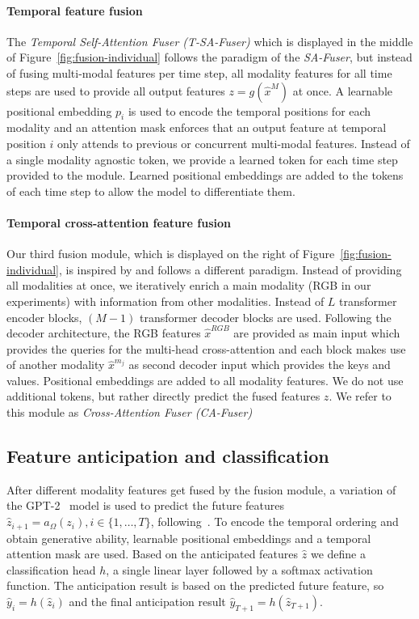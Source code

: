 \documentclass[10pt,twocolumn,letterpaper,dvipsnames]{article}
\begin{document}
\paragraph{Temporal feature fusion}
\label{sec:t-cmtfuser}
The \emph{Temporal Self-Attention Fuser (T-SA-Fuser)} which is displayed in the middle of Figure~\ref{fig:fusion-individual} follows the paradigm of the \emph{SA-Fuser}, but instead of fusing multi-modal features per time step, all modality features for all time steps are used to provide all output features $z = g(\hat{x}^M)$ at once. A learnable positional embedding $p_i$ is used to encode the temporal positions for each modality and an attention mask enforces that an output feature at temporal position $i$ only attends to previous or concurrent multi-modal features. Instead of a single modality agnostic token, we provide a learned token for each time step provided to the module. Learned positional embeddings are added to the tokens of each time step to allow the model to differentiate them.
\paragraph{Temporal cross-attention feature fusion}
Our third fusion module, which is displayed on the right of Figure~\ref{fig:fusion-individual}, is inspired by \cite{huang2020multimodal} and follows a different paradigm. Instead of providing all modalities at once, we iteratively enrich a main modality (RGB in our experiments) with information from other modalities. Instead of $L$ transformer encoder blocks, $(M-1)$ transformer decoder blocks \cite{vaswaniAttentionAllYou2017} are used. Following the decoder architecture, the RGB features $\hat{x}^{RGB}$ are provided as main input which provides the queries for the multi-head cross-attention and each block makes use of another modality $\hat{x}^{m_j}$ as second decoder input which provides the keys and values. Positional embeddings are added to all modality features. We do not use additional tokens, but rather directly predict the fused features $z$. We refer to this module as \emph{Cross-Attention Fuser (CA-Fuser)}

\subsection{Feature anticipation and classification}
\label{sec:classification}
After different modality features get fused by the fusion module, a variation of the GPT-2~\cite{radford2019language} model is used to predict the future features $\hat{z}_{i+1} = a_\Omega(z_i), i\in\{1,\dots,T\}$, following~\cite{girdharAnticipativeVideoTransformer2021}. To encode the temporal ordering and obtain generative ability, learnable positional embeddings and a temporal attention mask are used.
Based on the anticipated features $\hat{z}$ we define a classification head $h$, a single linear layer followed by a softmax activation function. The anticipation result is based on the predicted future feature, so $\hat{y}_i = h(\hat{z}_{i})$ and the final anticipation result $\hat{y}_{T+1} = h(\hat{z}_{T+1})$.
\end{document}

